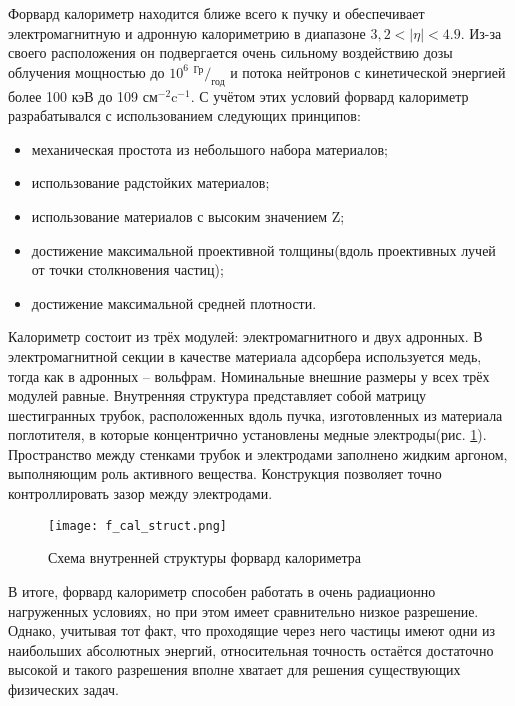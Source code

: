 Форвард калориметр находится ближе всего к пучку и обеспечивает электромагнитную и адронную калориметрию в диапазоне $3,2 < |\eta| < 4.9$. Из-за своего расположения он подвергается очень сильному воздействию дозы облучения мощностью до $10^6$ ${^\text{Гр}} / _\text{год}$ и потока нейтронов с кинетической энергией более 100 кэВ до 109 $\text{см}^{-2}\text{c}^{-1}$\parencite{tdr_old}. С учётом этих условий форвард калориметр разрабатывался с использованием следующих принципов:
\begin{itemize}
    \item механическая простота из небольшого набора материалов;
    \item использование радстойких материалов;
    \item использование материалов с высоким значением Z;
    \item достижение максимальной проективной толщины(вдоль проективных лучей от точки столкновения частиц);
    \item достижение максимальной средней плотности.
\end{itemize}\par
Калориметр состоит из трёх модулей: электромагнитного и двух адронных. В электромагнитной секции в качестве материала адсорбера используется медь, тогда как в адронных -- вольфрам. Номинальные внешние размеры у всех трёх модулей равные. Внутренняя структура представляет собой матрицу шестигранных трубок, расположенных вдоль пучка, изготовленных из материала поглотителя, в которые концентрично установлены медные электроды(рис. \ref{fig:f_cal_struct}). Пространство между стенками трубок и электродами заполнено жидким аргоном, выполняющим роль активного вещества. Конструкция позволяет точно контроллировать зазор между электродами.
\begin{figure}[ht]
    \centering
    \texttt{[image: f\_cal\_struct.png]}
    \caption{Схема внутренней структуры форвард калориметра\parencite{tdr_old}}
    \label{fig:f_cal_struct}
\end{figure}\par
В итоге, форвард калориметр способен работать в очень радиационно нагруженных условиях, но при этом имеет сравнительно низкое разрешение. Однако, учитывая тот факт, что проходящие через него частицы имеют одни из наибольших абсолютных энергий, относительная точность остаётся достаточно высокой и такого разрешения вполне хватает для решения существующих физических задач.
